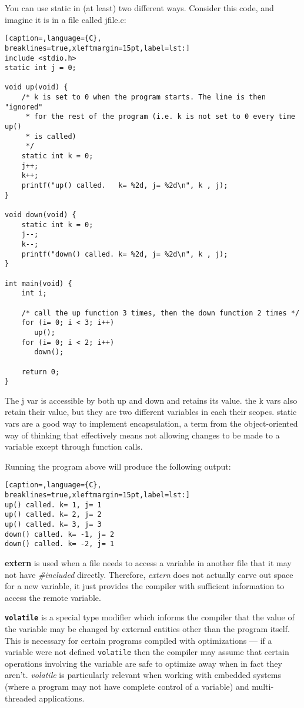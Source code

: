 You can use static in (at least) two different ways. Consider this code, and
imagine it is in a file called jfile.c:


\lstset{basicstyle=\scriptsize, numbers=left, captionpos=b, tabsize=4}
\begin{lstlisting}[caption=,language={C},
breaklines=true,xleftmargin=15pt,label=lst:]
include <stdio.h>
static int j = 0;
	
void up(void) {
	/* k is set to 0 when the program starts. The line is then "ignored"
	 * for the rest of the program (i.e. k is not set to 0 every time up()
	 * is called)
	 */
	static int k = 0;
	j++;
	k++;
	printf("up() called.   k= %2d, j= %2d\n", k , j);
}
	
void down(void) {
	static int k = 0;
	j--;
	k--;
	printf("down() called. k= %2d, j= %2d\n", k , j);
}
	
int main(void) {
	int i;
	  
	/* call the up function 3 times, then the down function 2 times */
	for (i= 0; i < 3; i++)
	   up();
	for (i= 0; i < 2; i++)
	   down();
	 
	return 0;
}
\end{lstlisting}

The j var is accessible by both up and down and retains its value. the k vars
also retain their value, but they are two different variables in each their
scopes. static vars are a good way to implement encapsulation, a term from the
object-oriented way of thinking that effectively means not allowing changes to
be made to a variable except through function calls.

Running the program above will produce the following output:
\lstset{basicstyle=\scriptsize, numbers=left, captionpos=b, tabsize=4}
\begin{lstlisting}[caption=,language={C},
breaklines=true,xleftmargin=15pt,label=lst:]
up() called. k= 1, j= 1
up() called. k= 2, j= 2
up() called. k= 3, j= 3
down() called. k= -1, j= 2
down() called. k= -2, j= 1
\end{lstlisting}

\textbf{extern} is used when a file needs to access a variable in another file
that it may not have \textit{\#included} directly.  Therefore, \emph{extern}
does not actually carve out space for a new variable, it just provides the
compiler with sufficient information to access the remote variable.

\textbf{\texttt{volatile}} is a special type modifier which informs the
compiler that the value of the variable may be changed by external entities
other than the program itself. This is necessary for certain programs compiled
with optimizations --- if a variable were not defined \texttt{volatile} then
the compiler may assume that certain operations involving the variable are safe
to optimize away when in fact they aren't. \emph{volatile} is particularly
relevant when working with embedded systems (where a program may not have
complete control of a variable) and multi-threaded applications.

